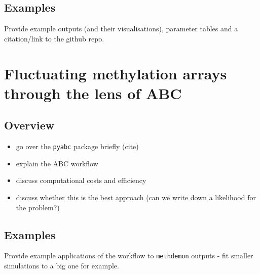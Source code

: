 \subsection{Examples}
Provide example outputs (and their visualisations), parameter tables and a citation/link to the github repo.

\section{Fluctuating methylation arrays through the lens of ABC}\label{section:methabc}
\subsection{Overview}
\begin{itemize}
    \item go over the \texttt{pyabc} package briefly (cite)
    \item explain the ABC workflow
    \item discuss computational costs and efficiency
    \item discuss whether this is the best approach (can we write down a likelihood for the problem?)
\end{itemize}
\subsection{Examples}
Provide example applications of the workflow to \texttt{methdemon} outputs - fit smaller simulations to a big one for example.
